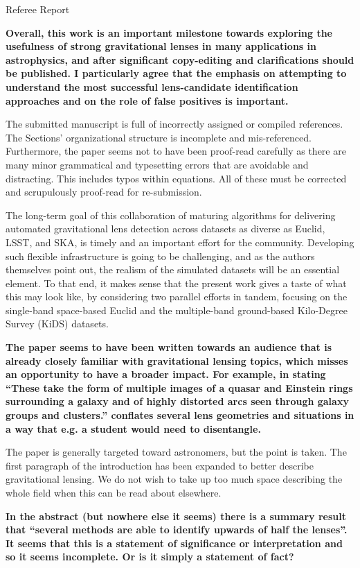 \documentclass[11pt,a4paper]{article}
\author{R.B. Metcalf}
\begin{document}
Referee Report

{\bf 
Overall, this work is an important milestone towards exploring the usefulness of strong gravitational lenses in many applications in astrophysics, and after significant copy-editing and clarifications should be published.  I particularly agree that the emphasis on attempting to understand the most successful lens-candidate identification approaches and on the role of false positives is important. 

The submitted manuscript is full of incorrectly assigned or compiled references.  The Sections’ organizational structure is incomplete and mis-referenced. Furthermore, the paper seems not to have been proof-read carefully as there are many minor grammatical and typesetting errors that are avoidable and distracting.  This includes typos within equations.  All of these must be corrected and scrupulously proof-read for re-submission.  

The long-term goal of this collaboration of maturing algorithms for delivering automated gravitational lens detection across datasets as diverse as Euclid, LSST, and SKA, is timely and an important effort for the community.  Developing such flexible infrastructure is going to be challenging, and as the authors themselves point out, the realism of the simulated datasets will be an essential element. To that end, it makes sense that the present work gives a taste of what this may look like, by considering two parallel efforts in tandem, focusing on the single-band space-based Euclid and the multiple-band ground-based Kilo-Degree Survey (KiDS) datasets. 
}

{\bf
The paper seems to have been written towards an audience that is already closely familiar with gravitational lensing topics, which misses an opportunity to have a broader impact. For example, in stating “These take the form of multiple images of a quasar and Einstein rings surrounding a galaxy and of highly distorted arcs seen through galaxy groups and clusters.” conflates several lens geometries and situations in a way that e.g. a student would need to disentangle. 
}

The paper is generally targeted toward astronomers, but the point is taken.  The first paragraph of the introduction has been expanded to better describe gravitational lensing.  We do not wish to take up too much space describing the whole field when this can be read about elsewhere.

{\bf
In the abstract (but nowhere else it seems) there is a summary result that “several methods are able to identify upwards of half the lenses”.  It seems that this is a statement of significance or interpretation and so it seems incomplete.  Or is it simply a statement of fact? 
}
\end{document}
